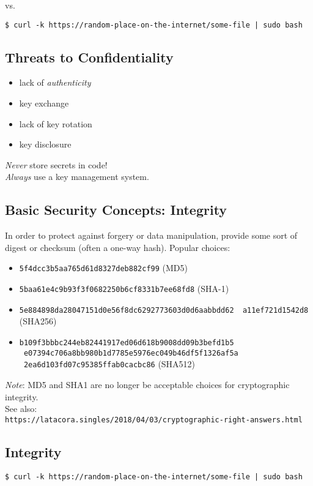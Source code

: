 \documentclass[xga]{xdvislides}
\begin{document}
vs.

\begin{verbatim}
$ curl -k https://random-place-on-the-internet/some-file | sudo bash
\end{verbatim}

\subsection{Threats to Confidentiality}
\begin{itemize}
	\item lack of {\em authenticity}
	\item key exchange
	\item lack of key rotation
	\item key disclosure
\end{itemize}
\addvspace{.5in}
{\em Never} store secrets in code! \\
{\em Always} use a key management system.

\subsection{Basic Security Concepts: Integrity}
In order to protect against forgery or data manipulation, provide some sort of
digest or checksum (often a one-way hash).  Popular choices:

\begin{itemize}
	\item {\tt 5f4dcc3b5aa765d61d8327deb882cf99} (MD5)
	\item {\tt 5baa61e4c9b93f3f0682250b6cf8331b7ee68fd8} (SHA-1)
	\item {\tt 5e884898da28047151d0e56f8dc6292773603d0d6aabbdd62 \
                   a11ef721d1542d8} (SHA256)
	\item {\tt b109f3bbbc244eb82441917ed06d618b9008dd09b3befd1b5 \
                   e07394c706a8bb980b1d7785e5976ec049b46df5f1326af5a \
                   2ea6d103fd07c95385ffab0cacbc86} (SHA512)
\end{itemize}
\vspace{.25in}

{\em Note}: MD5 and SHA1 are no longer be acceptable
choices for cryptographic integrity.
\\

See also: \\
\verb+https://latacora.singles/2018/04/03/cryptographic-right-answers.html+

\subsection{Integrity}
\begin{verbatim}
$ curl -k https://random-place-on-the-internet/some-file | sudo bash
\end{verbatim}
\end{document}
